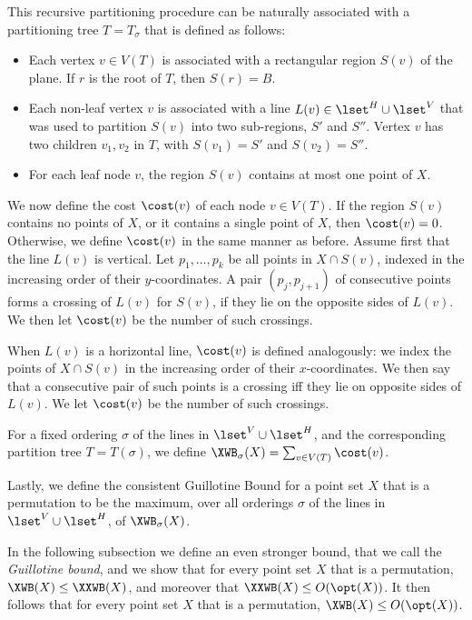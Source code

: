%
%

This recursive partitioning procedure can be naturally associated with a partitioning tree  $T=T_{\sigma}$ that is defined as follows: 

\begin{itemize}
\item Each vertex $v\in V(T)$ is associated with a rectangular region $S(v)$ of the plane. If $r$ is the root of $T$, then $S(r) =B$. 

\item Each non-leaf vertex $v$  is associated with a line $L(v)\in \lset^H\cup \lset^V$ that was used to partition $S(v)$ into two sub-regions, $S'$ and $S''$. Vertex $v$ has two children $v_1,v_2$ in $T$, with $S(v_1)=S'$ and $S(v_2)=S''$.

\item For each leaf node $v$, the region $S(v)$ contains at most one point of $X$.
\end{itemize}  




We now define the cost $\cost(v)$ of each node $v\in V(T)$. If the region $S(v)$ contains no points of $X$, or it contains a single point of $X$, then $\cost(v)=0$. Otherwise, we define $\cost(v)$ in the same manner as before. Assume first that the line $L(v)$ is vertical. Let $p_1, \ldots, p_k$  be all points in $X\cap S(v)$, indexed in the increasing order of their $y$-coordinates. A pair $(p_j, p_{j+1})$ of consecutive  points forms a crossing of $L(v)$ for $S(v)$, if they lie on the opposite sides of $L(v)$. We then let $\cost(v)$ be the number of such crossings. 

When $L(v)$ is a horizontal line, $\cost(v)$ is defined analogously: we index the points of $X\cap S(v)$ in the increasing order of their $x$-coordinates. We then say that a consecutive pair of such points is a crossing iff they lie on opposite sides of $L(v)$. We let $\cost(v)$ be the number of such crossings.

For a fixed ordering $\sigma$ of the lines in $\lset^V\cup \lset^H$, and the corresponding partition tree $T= T(\sigma)$, we define $\XWB_{\sigma}(X) = \sum_{v \in V(T)} \cost(v)$. 

Lastly, we define the consistent Guillotine Bound for a point set $X$ that is a permutation to be the maximum, over all orderings $\sigma$ of the lines in $\lset^V\cup \lset^H$, of $\XWB_{\sigma}(X)$.  


In the following subsection we define an even stronger bound, that we call the \emph{Guillotine bound}, and we show that for every point set $X$ that is a permutation, $\XWB(X)\leq \XXWB(X)$, and moreover that $\XXWB(X)\leq O(\opt(X))$. It then follows that for every point set $X$ that is a permutation, $\XWB(X)\leq O(\opt(X))$.

